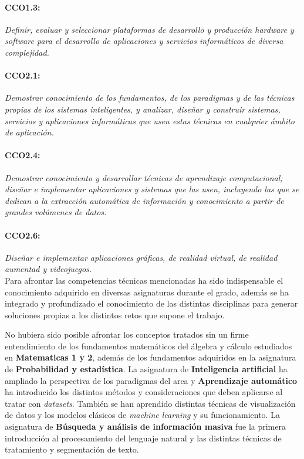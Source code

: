 \paragraph{CCO1.3:}\textit{Definir, evaluar y seleccionar plataformas de desarrollo y producción hardware y software para el desarrollo de aplicaciones y servicios informáticos de diversa complejidad.}%
\paragraph{CCO2.1:}\textit{Demostrar conocimiento de los fundamentos, de los paradigmas y de las técnicas propias de los sistemas inteligentes, y analizar, diseñar y construir sistemas, servicios y aplicaciones informáticas que usen estas técnicas en cualquier ámbito de aplicación.}%
\paragraph{CCO2.4:}\textit{Demostrar conocimiento y desarrollar técnicas de aprendizaje computacional; diseñar e implementar aplicaciones y sistemas que las usen, incluyendo las que se dedican a la extracción automática de información y conocimiento a partir de grandes volúmenes de datos.}%
\paragraph{CCO2.6:}\textit{Diseñar e implementar aplicaciones gráficas, de realidad virtual, de realidad aumentad y videojuegos.}%
\\

Para afrontar las competencias técnicas mencionadas ha sido indispensable el conocimiento adquirido en diversas asignaturas durante el grado, además se ha integrado y profundizado el conocimiento de las distintas disciplinas para generar soluciones propias a los distintos retos que supone el trabajo.

No hubiera sido posible afrontar los conceptos tratados sin un firme entendimiento de los fundamentos matemáticos del álgebra y cálculo estudiados en \textbf{Matematicas 1 y 2}, además de los fundamentos adquiridos en la asignatura de \textbf{Probabilidad y estadística}.
La asignatura de \textbf{Inteligencia artificial} ha ampliado la perspectiva de los paradigmas del area y \textbf{Aprendizaje automático} ha introducido los distintos métodos y consideraciones que deben aplicarse al tratar con \textit{datasets}. También se han aprendido distintas técnicas de visualización de datos y los modelos clásicos de \textit{machine learning} y su funcionamiento.
La asignatura de \textbf{Búsqueda y análisis de información masiva} fue la primera introducción al procesamiento del lenguaje natural y las distintas técnicas de tratamiento y segmentación de texto.

